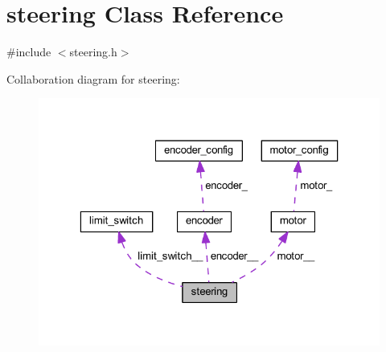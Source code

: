 \hypertarget{classsteering}{}\section{steering Class Reference}
\label{classsteering}


{\ttfamily \#include $<$steering.\+h$>$}



Collaboration diagram for steering\+:
\nopagebreak
\begin{figure}[H]
\begin{center}
\leavevmode
\includegraphics[width=323pt]{classsteering__coll__graph}
\end{center}
\end{figure}
